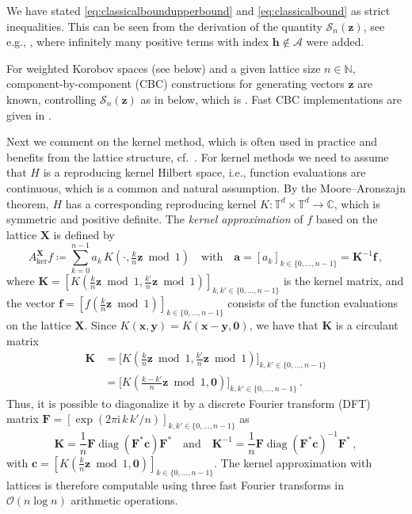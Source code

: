 \documentclass[a4paper]{amsart}
\DeclareMathOperator{\Diag}{diag}
\newcommand{\modone}{\bmod{}1}
\begin{document}
We have stated \eqref{eq:classicalboundupperbound} and \eqref{eq:classicalbound} as strict inequalities.
This can be seen from the derivation of the quantity $\mathcal S_n(\bm z)$, see e.g., \cite[Formula (2.7)]{CKNS20}, where infinitely many positive terms with index $\bm h\notin\mathcal A$ were added.

For weighted Korobov spaces (see  below) and a given lattice size $n\in\mathds N$, component-by-component (CBC) constructions for generating vectors $\bm z$ are known, controlling $\mathcal S_n(\bm z)$ as in  below, which is \cite[Theorem~3.3]{KMN24}.
Fast CBC implementations are given in \cite{CKNS20, GS25}.

Next we comment on the kernel method, which is often used in practice and benefits from the lattice structure, cf.\ \cite[Section~5]{KKKNS21}.
For kernel methods we need to assume that $H$ is a reproducing kernel Hilbert space, i.e., function evaluations are continuous, which is a common and natural assumption.
By the Moore--Aronszajn theorem, $H$ has a corresponding reproducing kernel $K\colon\mathds T^d\times\mathds T^d\to\mathds C$, which is symmetric and positive definite.
The \emph{kernel approximation} of $f$ based on the lattice $\bm X$ is defined by
\begin{equation}\label{eq:kernelmethod}
    A_{\text{ker}}^{\bm X}f
    \coloneqq \sum_{k=0}^{n-1} a_k \, K(\cdot,\tfrac kn\bm z\modone)
    \quad\text{with}\quad
    \bm a = [a_k]_{k\in\{0,\dots, n-1\}} = \bm K^{-1}\bm f \,,
\end{equation}
where $\bm K = [K(\tfrac kn\bm z\modone, \tfrac{k'}{n}\bm z\modone)]_{k,k'\in \{0,\dots,n-1\}}$ is the kernel matrix, and the vector $\bm f = [f(\tfrac kn\bm z\modone)]_{k\in \{0,\dots,n-1\}}$ consists of the function evaluations on the lattice $\bm X$.
Since $K(\bm x,\bm y) = K(\bm x-\bm y,\bm 0)$, we have that $\bm K$ is a circulant matrix
\begin{align*}
    \bm K
    &= \Big[K(\tfrac kn\bm z\modone, \tfrac{k'}{n}\bm z\modone)\Big]_{k,k'\in \{0,\dots,n-1\}} \\
    &= \Big[K(\tfrac {k-k'}n\bm z\modone, \bm 0)\Big]_{k,k'\in \{0,\dots,n-1\}} \,.
\end{align*}
Thus, it is possible to diagonalize it by a discrete Fourier transform (DFT) matrix $\bm F = [\exp(2\pi\mathrm i \, k \, k'/n)]_{k,k'\in\{0,\dots,n-1\}}$ as
\begin{equation*}
    \bm K = \frac 1n \bm F \Diag( \bm F^\ast \bm c ) \bm F^\ast
    \quad\text{and}\quad
    \bm K^{-1} = \frac 1n \bm F \Diag( \bm F^\ast \bm c )^{-1} \bm F^\ast \,,
\end{equation*}
with $\bm c = [ K(\frac kn\bm z\modone,\bm 0) ]_{k\in\{0,\dots,n-1\}}$.
The kernel approximation with lattices is therefore computable using three fast Fourier transforms in $\mathcal O(n\log n)$ arithmetic operations.
\end{document}
